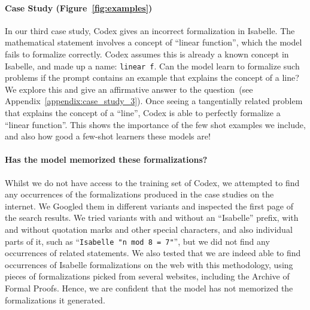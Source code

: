 \documentclass{article}
\begin{document}
\paragraph{Case Study  (Figure~\ref{fig:examples})} In our third case study, Codex gives an incorrect formalization in Isabelle. The mathematical statement involves a concept of ``linear function'', which the model fails to formalize correctly. Codex assumes this is already a known concept in Isabelle, and made up a name: \texttt{linear~f}. Can the model learn to formalize such problems if the prompt contains an example that explains the concept of a line? We explore this and give an affirmative answer to the question~(see Appendix~\ref{appendix:case_study_3}). Once seeing a tangentially related problem that explains the concept of a ``line'', Codex is able to perfectly formalize a ``linear function''. This shows the importance of the few shot examples we include, and also how good a few-shot learners these models are!  





















\paragraph{Has the model memorized these formalizations?}
Whilst we do not have access to the training set of Codex, we attempted to find any occurrences of the formalizations produced in the case studies on the internet.
We Googled them in different variants and inspected the first page of the search results.
We tried variants with and without an ``Isabelle'' prefix, with and without quotation marks and other special characters, and also individual parts of it, such as ``\texttt{Isabelle "n mod 8 = 7"}'', but we did not find any occurrences of related statements.
We also tested that we are indeed able to find occurrences of Isabelle formalizations on the web with this methodology, using pieces of formalizations picked from several websites, including the Archive of Formal Proofs. Hence, we are confident that the model has not memorized the formalizations it generated.
\end{document}
